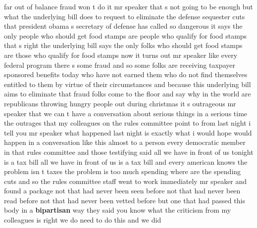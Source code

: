 \documentclass{article}
\begin{document}
far out of balance fraud won t do it mr speaker that s not going to be enough but what the underlying bill does to request to eliminate the defense sequester cuts that president obama s secretary of defense has called so dangerous it says the only people who should get food stamps are people who qualify for food stamps that s right the underlying bill says the only folks who should get food stamps are those who qualify for food stamps now it turns out mr speaker like every federal program there s some fraud and so some folks are receiving taxpayer sponsored benefits today who have not earned them who do not find themselves entitled to them by virtue of their circumstances and because this underlying bill aims to eliminate that fraud folks come to the floor and say why in the world are republicans throwing hungry people out during christmas it s outrageous mr speaker that we can t have a conversation about serious things in a serious time the outrages that my colleagues on the rules committee point to from last night i tell you mr speaker what happened last night is exactly what i would hope would happen in a conversation like this almost to a person every democratic member in that rules committee and those testifying said all we have in front of us tonight is a tax bill all we have in front of us is a tax bill and every american knows the problem isn t taxes the problem is too much spending where are the spending cuts and so the rules committee staff went to work immediately mr speaker and found a package not that had never been seen before not that had never been read before not that had never been vetted before but one that had passed this body in a {\bf \color{red} bipartisan} way they said you know what the criticism from my colleagues is right we do need to do this and we did
\vspace{8mm}
\end{document}
